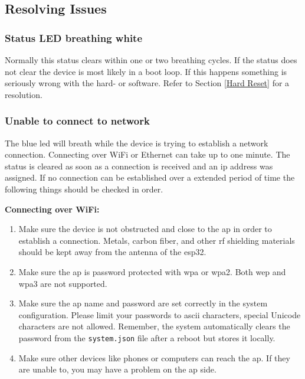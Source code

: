 \subsection{Resolving Issues} \label{Resolving Issues}

\subsubsection{Status LED breathing white}
Normally this status clears within one or two breathing cycles. If the status does not clear the device is most likely in a boot loop. If this happens something is seriously wrong with the hard- or software. Refer to Section \ref{Hard Reset} for a resolution.

\subsubsection{Unable to connect to network}
The blue \acrshort{led} will breath while the device is trying to establish a network connection. Connecting over WiFi or Ethernet can take up to one minute. The status is cleared as soon as a connection is received and an \acrshort{ip} address was assigned. If no connection can be established over a extended period of time the following things should be checked in order.

\textbf{Connecting over WiFi:}
\begin{enumerate}
  \item Make sure the device is not obstructed and close to the \acrlong{ap} in order to establish a connection. Metals, carbon fiber, and other \acrshort{rf} shielding materials should be kept away from the antenna of the \gls{esp32}.
  \item Make sure the \acrlong{ap} is password protected with \acrshort{wpa} or \acrshort{wpa}2. Both \acrshort{wep} and \acrshort{wpa}3 are not supported.
  \item Make sure the \acrlong{ap} name and password are set correctly in the system configuration. Please limit your passwords to \acrshort{ascii} characters, special Unicode characters are not allowed. Remember, the system automatically clears the password from the \texttt{system.json} file after a reboot but stores it locally.
  \item Make sure other devices like phones or computers can reach the \acrlong{ap}. If they are unable to, you may have a problem on the \acrshort{ap} side.
\end{enumerate}

